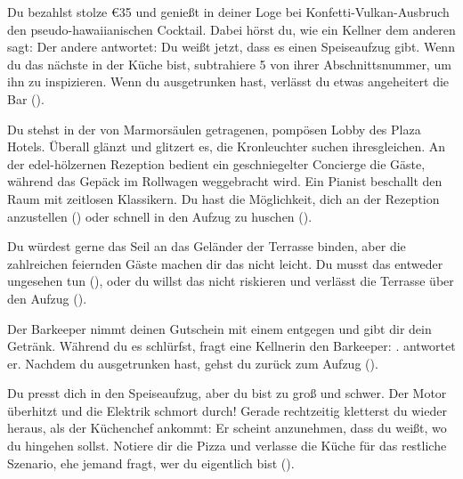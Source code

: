 {	%
	Du bezahlst stolze €35 und genießt in deiner Loge bei Konfetti-Vulkan-Ausbruch den pseudo-hawaiianischen Cocktail. Dabei hörst du, wie ein Kellner dem anderen sagt:  Der andere antwortet:  Du weißt jetzt, dass es einen Speiseaufzug gibt. Wenn du das nächste in der Küche bist, subtrahiere 5 von ihrer Abschnittsnummer, um ihn zu inspizieren. Wenn du ausgetrunken hast, verlässt du etwas angeheitert die Bar ().

	Du stehst in der von Marmorsäulen getragenen, pompösen Lobby des Plaza Hotels. Überall glänzt und glitzert es, die Kronleuchter suchen ihresgleichen. An der edel-hölzernen Rezeption bedient ein geschniegelter Concierge die Gäste, während das Gepäck im Rollwagen weggebracht wird. Ein Pianist beschallt den Raum mit zeitlosen Klassikern. Du hast die Möglichkeit, dich an der Rezeption anzustellen () oder schnell in den Aufzug zu huschen ().

	Du würdest gerne das Seil an das Geländer der Terrasse binden, aber die zahlreichen feiernden Gäste machen dir das nicht leicht. Du musst das entweder ungesehen tun (), oder du willst das nicht riskieren und verlässt die Terrasse über den Aufzug ().

	Der Barkeeper nimmt deinen Gutschein mit einem  entgegen und gibt dir dein Getränk. Während du es schlürfst, fragt eine Kellnerin den Barkeeper: .  antwortet er. Nachdem du ausgetrunken hast, gehst du zurück zum Aufzug ().

	Du presst dich in den Speiseaufzug, aber du bist zu groß und schwer. Der Motor überhitzt und die Elektrik schmort durch! Gerade rechtzeitig kletterst du wieder heraus, als der Küchenchef ankommt:  Er scheint anzunehmen, dass du weißt, wo du hingehen sollst. Notiere dir die Pizza  und verlasse die Küche für das restliche Szenario, ehe jemand fragt, wer du eigentlich bist ().

}

